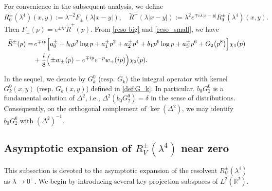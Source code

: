 \documentclass[reqno]{amsart}
\numberwithin{equation}{section}
\begin{document}
For convenience in the subsequent analysis, we define
\begin{equation}\label{def:F_pm}
R^\pm_0(\lambda^4)(x,y):=\lambda^{-2}F_\pm(\lambda|x-y|),\quad
\widetilde{R}^\pm(\lambda|x-y|):=\lambda^{2}e^{\mp i\lambda|x-y|}R^\pm_0(\lambda^4)(x,y).
\end{equation}
Then $F_\pm(p)=e^{\pm ip}\widetilde{R}^\pm(p)$. From \eqref{reso-big} and \eqref{reso_small},    we have
\begin{equation}\label{free-widetilde_R}
\begin{aligned}
\widetilde{R}^\pm(p)=&\,e^{\mp ip}\Bigl[a_0^\pm+b_0p^2\log p+a_1^\pm p^2
                     +a_2^\pm p^4+b_1p^6\log p+a_3^\pm p^6+O_2\bigl(p^{8}\bigr)\Bigr]\chi_1(p)\\
                     &+\frac{i}{8}\Bigl(\pm w_\pm(p)-e^{\mp ip}e^{-p}w_+(ip)\Bigr)\chi_2(p).
\end{aligned}
\end{equation}


In the sequel,  we denote by $G_k^0$ (resp. $G_k$) the integral operator with kernel $G_k^0(x,y)$ (resp. $G_k(x,y)$) defined in \eqref{def:G_k}.
In particular, $b_0 G_2^0$ is a fundamental solution of $\Delta^2$, i.e., $\Delta^2 (b_0 G_2^0) = \delta$ in the sense of distributions. Consequently, on the orthogonal complement of $\ker(\Delta^2)$, we may identify $b_0 G_2^0$ with $(\Delta^2)^{-1}$.


\subsection{Asymptotic expansion of $R_V^\pm(\lambda^4)$ near zero}\label{subsec:Q}  
This subsection is devoted to the asymptotic expansion of the resolvent $R_V^\pm(\lambda^4)$ as $\lambda\to 0^+$. We begin by introducing several key projection subspaces of $L^2(\mathbb{R}^2)$.  
\end{document}
